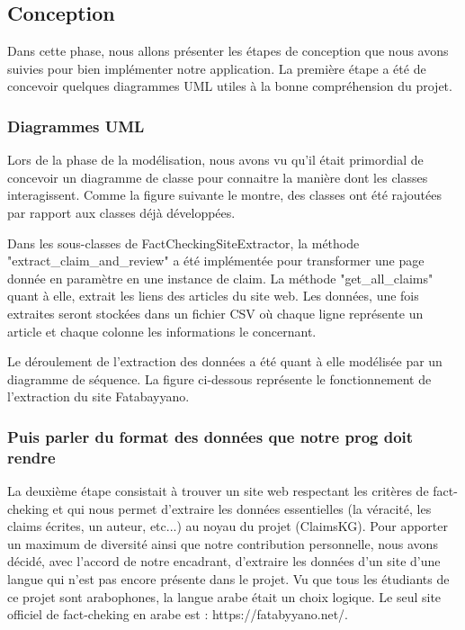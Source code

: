 \documentclass[oneside,13pt,a4paper]{report}
\begin{document}
\subsection{Conception}

Dans cette phase, nous allons présenter les étapes de conception que nous avons suivies pour bien implémenter notre application. La première étape a été de concevoir quelques diagrammes UML utiles à la bonne compréhension du projet.

\subsubsection{Diagrammes UML}

Lors de la phase de la modélisation, nous avons vu qu'il était primordial de concevoir un diagramme de classe pour connaitre la manière dont les classes interagissent. Comme la figure suivante le montre, des classes ont été rajoutées par rapport aux classes déjà développées.

Dans les sous-classes de FactCheckingSiteExtractor, la méthode "extract\_claim\_and\_review" a été implémentée pour transformer une page donnée en paramètre en une instance de claim. La méthode  "get\_all\_claims" quant à elle, extrait les liens des articles du site web. Les données, une fois extraites seront stockées dans un fichier CSV où chaque ligne représente un article et chaque colonne les informations le concernant.


Le déroulement de l'extraction des données a été quant à elle modélisée par un diagramme de séquence. La figure ci-dessous représente le fonctionnement de l'extraction du site Fatabayyano.


\subsubsection*{Puis parler du format des données que notre prog doit rendre}

La deuxième étape consistait à trouver un site web respectant les critères de fact-cheking et qui nous permet d'extraire les données essentielles (la véracité, les claims écrites, un auteur, etc...) au noyau du projet (ClaimsKG). Pour apporter un maximum de diversité ainsi que notre contribution personnelle, nous avons décidé, avec l'accord de notre encadrant, d'extraire les données d'un site d'une langue qui n'est pas encore présente dans le projet. Vu que tous les étudiants de ce projet sont arabophones, la langue arabe était un choix logique. Le seul site officiel de fact-cheking en arabe est : https://fatabyyano.net/.
\end{document}
